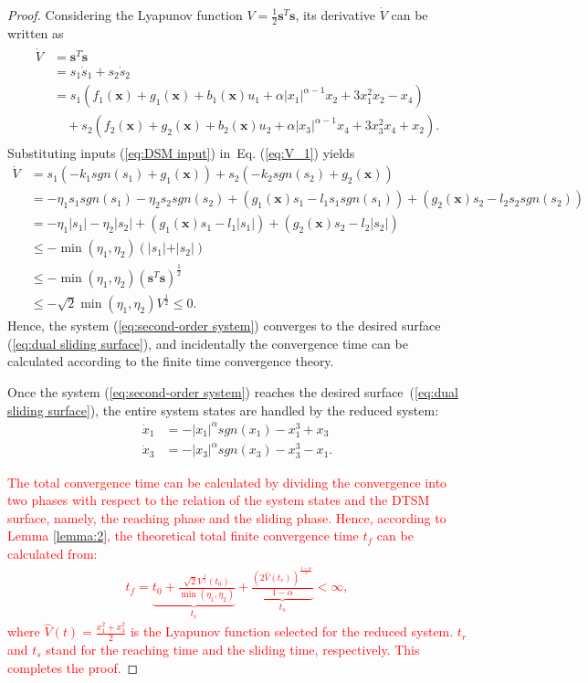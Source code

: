 \documentclass[3p]{elsarticle}
\theoremstyle{plain}
\theoremstyle{remark}
\begin{document}
\begin{proof}
Considering the Lyapunov function $V=\frac{1}{2}{\bm s}^T\bm s$, its derivative $\dot V$ can be written as
\begin{align}
\begin{split}
\dot V &= {\bm s}^T\dot{\bm  s}\\
&=s_1\dot s_1+s_2\dot s_2\\
&=s_1(f_1(\bm x)+g_1(\bm x)+b_1(\bm x)u_1+\alpha\vert x_1\vert^{\alpha-1}x_2+3x_1^2x_2-x_4)\\
&\quad +s_2(f_2(\bm x)+g_2(\bm x)+b_2(\bm x)u_2+\alpha\vert x_3\vert^{\alpha-1}x_4+3x_3^2x_4+x_2).\label{eq:V_1}
\end{split}
\end{align}
Substituting inputs (\ref{eq:DSM input}) in~Eq. (\ref{eq:V_1}) yields
\begin{align*}
\dot V &= s_1(-k_1sgn(s_1)+g_1(\bm x))+s_2(-k_2sgn(s_2)+g_2(\bm x))\\
&= -\eta_1s_1sgn(s_1)-\eta_2s_2sgn(s_2)+(g_1(\bm x)s_1 - l_1s_1sgn(s_1))+(g_2(\bm x)s_2 - l_2s_2sgn(s_2))\\
&= -\eta_1\vert s_1\vert-\eta_2\vert s_2\vert+(g_1(\bm x)s_1 - l_1\vert s_1\vert)+(g_2(\bm x)s_2 - l_2\vert s_2\vert)\\
&\le - \min(\eta_1,\eta_2)(\vert s_1\vert+\vert s_2\vert)\\
&\le -\min(\eta_1,\eta_2)({\bm s}^T\bm s)^\frac{1}{2}\\
&\le -\sqrt{2}\min(\eta_1,\eta_2)V^\frac{1}{2}\le 0.
\end{align*}
Hence, the system (\ref{eq:second-order system}) converges to the desired surface (\ref{eq:dual sliding surface}), and incidentally the convergence time can be calculated according to the finite time convergence theory.\par
Once the system (\ref{eq:second-order system}) reaches the desired surface~(\ref{eq:dual sliding surface}), the entire system states are handled by the reduced system:
\begin{align*}
\dot x_1&=-\vert x_1\vert^\alpha sgn(x_1)-x_1^3+x_3\\
\dot x_3&=-\vert x_3\vert^\alpha sgn(x_3)-x_3^3-x_1.
\end{align*}\par
\textcolor{red}{The total convergence time can be calculated by dividing the convergence into two phases with respect to the relation of the system states and the DTSM surface, namely, the reaching phase and the sliding phase. Hence, according to Lemma \ref{lemma:2}, the theoretical total finite convergence time $t_f$ can be calculated from:
\begin{align}
t_f = \underbrace{t_0+\frac{\sqrt{2}V^{\frac{1}{2}}(t_0)}{\min(\eta_1,\eta_2)}}_{t_r}+\underbrace{\frac{(2\hat V(t_r))^{\frac{1-\alpha}{2}}}{1-\alpha}}_{t_s}<\infty,
\end{align}
where $\hat V(t) = \frac{x_1^2+x_3^2}{2}$ is the Lyapunov function selected for the reduced system. $t_r$ and $t_s$ stand for the reaching time and the sliding time, respectively. This completes the proof.}
\end{proof}
\end{document}
